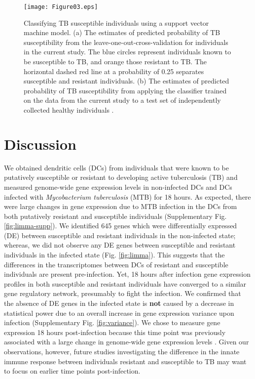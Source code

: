 \documentclass[fleqn,10pt]{wlscirep}
\begin{document}
\begin{figure}[ht]
\centering
\texttt{[image: Figure03.eps]}
\caption{
Classifying TB susceptible individuals using a support vector machine
model. (a) The estimates of predicted probability of TB susceptibility
from the leave-one-out-cross-validation for individuals in the current
study. The blue circles represent individuals known to be susceptible
to TB, and orange those resistant to TB. The horizontal dashed red
line at a probability of 0.25 separates susceptible and resistant
individuals. (b) The estimates of predicted probability of TB
susceptibility from applying the classifier trained on the data from
the current study to a test set of independently collected healthy
individuals \cite{Barreiro2012}.
}
\label{fig:classifier}
\end{figure}

\section*{Discussion}

We obtained dendritic cells (DCs) from individuals that were known to
be putatively susceptible or resistant to developing active
tuberculosis (TB) and measured genome-wide gene expression levels in
non-infected DCs and DCs infected with \emph{Mycobacterium
tuberculosis} (MTB) for 18 hours. As expected, there were large
changes in gene expression due to MTB infection in the DCs from both
putatively resistant and susceptible individuals (Supplementary Fig.
\ref{fig:limma-supp}). We identified 645 genes which were
differentially expressed (DE) between susceptible and resistant
individuals in the non-infected state; whereas, we did not observe any
DE genes between susceptible and resistant individuals in the infected
state (Fig. \ref{fig:limma}). This suggests that the differences in
the transcriptomes between DCs of resistant and susceptible
individuals are present pre-infection. Yet, 18 hours after infection
gene expression profiles in both susceptible and resistant individuals
have converged to a similar gene regulatory network, presumably to
fight the infection. We confirmed that the absence of DE genes in the
infected state is \textbf{not} caused by a decrease in statistical
power due to an overall increase in gene expression variance upon
infection (Supplementary Fig. \ref{fig:variance}). We chose to measure
gene expression 18 hours post-infection because this time point was
previously associated with a large change in genome-wide gene
expression levels \cite{Tailleux2008}. Given our observations,
however, future studies investigating the difference in the innate
immune response between individuals resistant and susceptible to TB
may want to focus on earlier time points post-infection.
\end{document}
